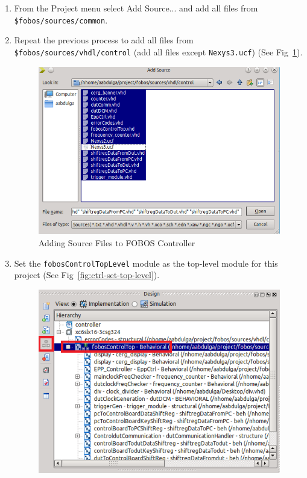 \begin{enumerate}
\begin{enumerate}
  \item From the Project menu select Add Source... and add all files from \texttt{\$fobos/sources/common}.
  \item Repeat the previous process to add all files from \texttt{\$fobos/sources/vhdl/control} (add all files except \texttt{Nexys3.ucf}) (See Fig~\ref{fig:ctrl-add-sources}).
		\begin{figure}[H]
		\begin{center}
		\includegraphics[scale=0.6]{figures/ctrl-add-sources}
		\caption{\label{fig:ctrl-add-sources}Adding Source Files to FOBOS Controller}
		\end{center} 
		\vspace{-1ex}
		\end{figure}
  \item Set the \texttt{fobosControlTopLevel} module as the top-level module for this project (See Fig~\ref{fig:ctrl-set-top-level}).
		\begin{figure}[H]
		\begin{center}
		\includegraphics[scale=0.6]{figures/ctrl-set-top-level}

\end{center}
\end{figure}
\end{enumerate}
\end{enumerate}
